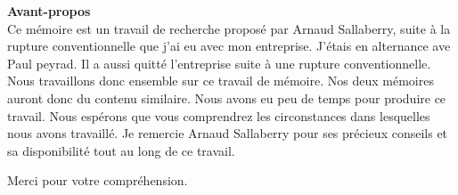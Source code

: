 \begin{center}
	\begin{minipage}{13cm}
	
	\textbf{Avant-propos}\\
 Ce mémoire est un travail de recherche proposé par Arnaud Sallaberry, suite à la rupture conventionnelle que j'ai eu avec mon entreprise. 
 J'étais en alternance ave Paul peyrad. Il a aussi quitté l'entreprise suite à une rupture conventionnelle. Nous travaillons donc ensemble sur ce travail de mémoire. Nos deux mémoires auront donc du contenu similaire.
 Nous avons eu peu de temps pour produire ce travail. Nous espérons que vous comprendrez les circonstances dans lesquelles nous avons travaillé.
 Je remercie Arnaud Sallaberry pour ses précieux conseils et sa disponibilité tout au long de ce travail.
 
 Merci pour votre compréhension.
		
	\end{minipage}
\end{center}
